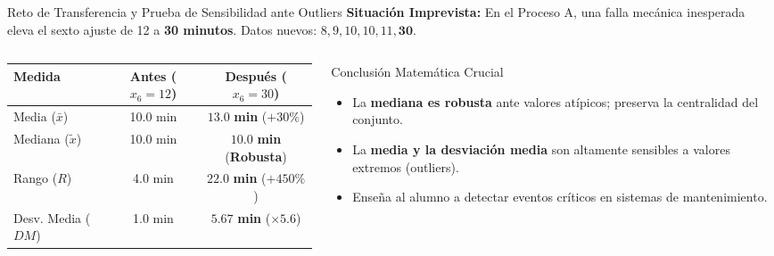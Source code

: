 \documentclass[
	spanish,
	aspectratio=169,
	xcolor={dvipsnames,table}
]{beamer}
\begin{document}
\begin{frame}{Reto de Transferencia y Prueba de Sensibilidad ante Outliers}
\small
\textbf{Situación Imprevista:} En el Proceso A, una falla mecánica inesperada eleva el sexto ajuste de 12 a \textbf{30 minutos}. Datos nuevos: $8, 9, 10, 10, 11, \mathbf{30}$.
\vspace{0.2cm}
\begin{columns}[T]
	\begin{column}{0.48\textwidth}
		\renewcommand{\arraystretch}{1.15}
		\begin{tabularx}{\linewidth}{l|c|c}
			\toprule
			\rowcolor{iiiepePale} \textbf{Medida} & \textbf{Antes ($x_6=12$)} & \textbf{Después ($x_6=30$)} \\
			\midrule
			Media ($\bar{x}$) & 10.0 min & $\mathbf{13.0}$ \textbf{min} ($+30\%$) \\
			Mediana ($\tilde{x}$) & 10.0 min & $\mathbf{10.0}$ \textbf{min} (\textbf{Robusta}) \\
			Rango ($R$) & 4.0 min & $\mathbf{22.0}$ \textbf{min} ($+450\%$) \\
			Desv. Media ($DM$) & 1.0 min & $\mathbf{5.67}$ \textbf{min} ($\times 5.6$) \\
			\bottomrule
		\end{tabularx}
	\end{column}
	\begin{column}{0.48\textwidth}
		\begin{alertblock}{Conclusión Matemática Crucial}
			\begin{itemize}\setlength{\itemsep}{0.1cm}
				\item La \textbf{mediana es robusta} ante valores atípicos; preserva la centralidad del conjunto.
				\item La \textbf{media y la desviación media} son altamente sensibles a valores extremos (outliers).
				\item Enseña al alumno a detectar eventos críticos en sistemas de mantenimiento.
			\end{itemize}
		\end{alertblock}
	\end{column}
\end{columns}
\end{frame}
\end{document}
